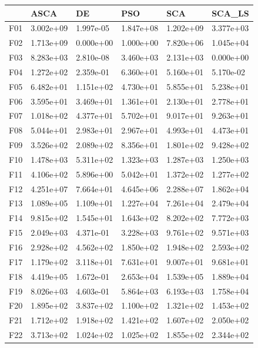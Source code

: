\begin{tabular}{llllll}
\toprule
{} &       ASCA &         DE &        PSO &        SCA &     SCA\_LS \\
\midrule
F01  &  3.002e+09 &  1.997e-05 &  1.847e+08 &  1.202e+09 &  3.377e+03 \\
F02  &  1.713e+09 &  0.000e+00 &  1.000e+00 &  7.820e+06 &  1.045e+04 \\
F03  &  8.283e+03 &  2.810e-08 &  3.460e+03 &  2.131e+03 &  0.000e+00 \\
F04  &  1.272e+02 &  2.359e-01 &  6.360e+01 &  5.160e+01 &  5.170e-02 \\
F05  &  6.482e+01 &  1.151e+02 &  4.730e+01 &  5.855e+01 &  5.238e+01 \\
F06  &  3.595e+01 &  3.469e+01 &  1.361e+01 &  2.130e+01 &  2.778e+01 \\
F07  &  1.018e+02 &  4.377e+01 &  5.702e+01 &  9.017e+01 &  9.263e+01 \\
F08  &  5.044e+01 &  2.983e+01 &  2.967e+01 &  4.993e+01 &  4.473e+01 \\
F09  &  3.526e+02 &  2.089e+02 &  8.356e+01 &  1.801e+02 &  9.428e+02 \\
F10  &  1.478e+03 &  5.311e+02 &  1.323e+03 &  1.287e+03 &  1.250e+03 \\
F11  &  4.106e+02 &  5.896e+00 &  5.042e+01 &  1.372e+02 &  1.277e+02 \\
F12  &  4.251e+07 &  7.664e+01 &  4.645e+06 &  2.288e+07 &  1.862e+04 \\
F13  &  1.089e+05 &  1.109e+01 &  1.227e+04 &  7.261e+04 &  2.479e+04 \\
F14  &  9.815e+02 &  1.545e+01 &  1.643e+02 &  8.202e+02 &  7.772e+03 \\
F15  &  2.049e+03 &  4.371e-01 &  3.228e+03 &  9.761e+02 &  9.571e+03 \\
F16  &  2.928e+02 &  4.562e+02 &  1.850e+02 &  1.948e+02 &  2.593e+02 \\
F17  &  1.179e+02 &  3.118e+01 &  7.631e+01 &  9.007e+01 &  9.681e+01 \\
F18  &  4.419e+05 &  1.672e-01 &  2.653e+04 &  1.539e+05 &  1.889e+04 \\
F19  &  8.026e+03 &  4.603e-01 &  5.864e+03 &  6.193e+03 &  1.758e+04 \\
F20  &  1.895e+02 &  3.837e+02 &  1.100e+02 &  1.321e+02 &  1.453e+02 \\
F21  &  1.712e+02 &  1.918e+02 &  1.421e+02 &  1.607e+02 &  2.050e+02 \\
F22  &  3.713e+02 &  1.024e+02 &  1.025e+02 &  1.855e+02 &  2.344e+02 \\

\end{tabular}
